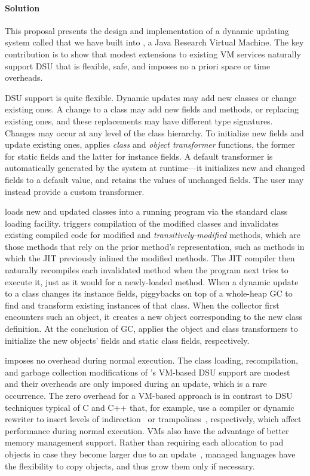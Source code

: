 \paragraph{Solution}
This proposal presents the design and implementation of a dynamic
updating system called \DSU{} that we have built into \JikesRVM{}, a
Java Research Virtual Machine.  The key contribution is to show that
modest extensions to existing VM services naturally support DSU that
is flexible, safe, and imposes no a priori space or time overheads.

\DSU{} DSU support is quite flexible.  Dynamic updates may add new
classes or change existing ones.  A change to a class may add new
fields and methods, or replacing existing ones, and these replacements
may have different type signatures.  Changes may occur at any level of
the class hierarchy.  To initialize new fields and update
existing ones, \DSU{} applies \emph{class} and \emph{object
  transformer} functions, the former for static fields and the latter
for instance fields.  A default transformer is automatically generated by
the system at runtime---it initializes new and changed fields to a default value,
and retains the values of unchanged fields. The user may instead provide a
custom transformer.

\DSU{} loads new and updated classes into a running program via the
standard class loading facility.  \DSU{} triggers compilation of the
modified classes and invalidates existing compiled code for modified and
\emph{transitively-modified} methods, which are those methods that
rely on the prior method's representation, such as methods in which the \acs{JIT}
previously inlined the modified methods. The \acf{JIT} compiler then
naturally recompiles each invalidated method when the program next
tries to execute it, just as it would for a newly-loaded method.
When a dynamic update to a class changes its instance fields, \DSU{}
piggybacks on top of a whole-heap \acf{GC} to find and transform existing
instances of that class.  When the collector first encounters such
an object, it creates a new object corresponding to the new class
definition.  At the conclusion of GC, \DSU{} applies the
object and class transformers to initialize the new objects' fields
and static class fields, respectively.

\DSU{} imposes no overhead during normal execution.  The class 
loading, recompilation, and garbage collection modifications of \DSU's
VM-based DSU support are modest and their overheads are only imposed
during an update, which is a rare occurrence.  The zero overhead for a
VM-based approach is in contrast to DSU techniques typical of C and C++
that, for example, use 
a compiler or dynamic rewriter to insert levels of
indirection~\cite{neamtiu06dsu, orso:java} or
trampolines~\cite{chen06vee,chen:icse07,altekar05opus,Ksplice}, respectively,
which affect performance during normal execution.  VMs also have the
advantage of better memory management support.  Rather than requiring
each allocation to pad objects in case they become larger due to an
update~\cite{neamtiu06dsu}, managed languages have the flexibility to
copy objects, and thus grow them only if necessary.

